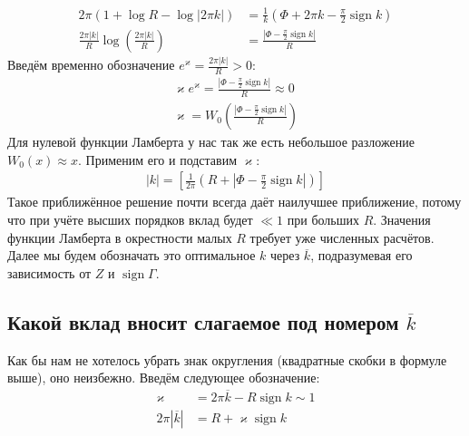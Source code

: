 \documentclass[a4paper, 12pt]{article}
\DeclareMathOperator*{\sign}{sign}
\begin{document}
\begin{equation}
\begin{aligned}
    2\pi\left(1+\log R - \log|2\pi k|\right) &= \frac{1}{k}\left(\Phi + 2\pi k - \frac{\pi}{2}\sign k\right)\\
    \frac{2\pi |k|}{R}\log\left(\frac{2\pi |k|}{R}\right) &= \frac{\left|\Phi - \frac{\pi}{2}\sign k\right|}{R}
\end{aligned}
\end{equation}
Введём временно обозначение $e^\varkappa = \frac{2\pi |k|}{R} > 0$:
\begin{equation}
\begin{aligned}
    \varkappa e^{\varkappa} = \frac{\left|\Phi - \frac{\pi}{2}\sign k\right|}{R}\approx 0\\
    \varkappa = W_0\left(\frac{\left|\Phi - \frac{\pi}{2}\sign k\right|}{R}\right)
\end{aligned}
\end{equation}
Для нулевой функции Ламберта у нас так же есть небольшое разложение $W_0(x)\approx x$. Применим его и подставим $\varkappa$:
\begin{equation}
\begin{aligned}
    |k|= \left[ \frac{1}{2\pi}\left(R + \left|\Phi - \frac{\pi}{2}\sign k\right|\right)\right]
\end{aligned}
\end{equation}
Такое приближённое решение почти всегда даёт наилучшее приближение, потому что при учёте высших порядков вклад будет $\ll 1$ при больших $R$. Значения функции Ламберта в окрестности малых $R$ требует уже численных расчётов. Далее мы будем обозначать это оптимальное $k$ через $\overline k$, подразумевая его зависимость от $Z$ и $\sign \Gamma$.

\subsection*{Какой вклад вносит слагаемое под номером $\overline{k}$}
Как бы нам не хотелось убрать знак округления (квадратные скобки в формуле выше), оно неизбежно. Введём следующее обозначение:
\begin{equation}
\begin{aligned}
    \varkappa &= 2\pi \overline{k} - R\sign k\sim 1\\
    2\pi |\overline{k}| &= R + \varkappa \sign k
\end{aligned}
\end{equation}
\end{document}
